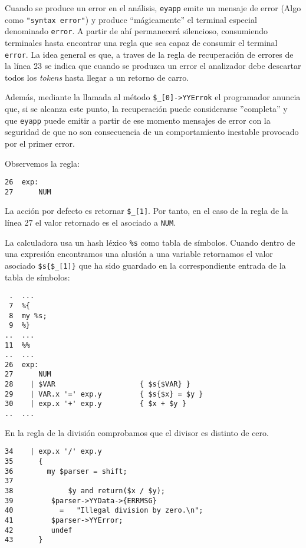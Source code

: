  Cuando se produce un error
en el análisis, \verb|eyapp| emite un mensaje de error (Algo
como \verb|"syntax error"|) y
produce ``mágicamente'' el terminal especial denominado
\verb|error|. A partir de ahí permanecerá silencioso,
consumiendo terminales hasta encontrar una
regla que sea capaz de consumir el terminal \verb|error|.
La idea general es que, a traves de la regla
de recuperación de errores de la línea 23 se
indica que cuando se produzca un error
el analizador debe descartar todos los \emph{tokens} hasta llegar a un
retorno de carro. 

Además, mediante la llamada al método  \verb|$_[0]->YYErrok| el programador
anuncia que, si se alcanza este punto, la recuperación puede considerarse ''completa''  y que 
\verb|eyapp| puede emitir a partir de ese momento mensajes de error
con la seguridad de que no son consecuencia de un comportamiento inestable
provocado por el primer error.



Observemos la regla:

\begin{verbatim}
26  exp:
27      NUM
\end{verbatim}
La acción por defecto es retornar \verb|$_[1]|. 
Por tanto, en el caso de la regla de la línea 27 
el valor retornado es el asociado a \verb|NUM|.


La calculadora usa un hash léxico \verb|%s| como tabla de símbolos.
Cuando dentro de una expresión encontramos una alusión a una variable
retornamos el valor asociado \verb|$s{$_[1]}| que ha sido guardado en la correspondiente
entrada de la tabla de símbolos:
\begin{verbatim}
 .  ...
 7  %{
 8  my %s;
 9  %}
..  ...
11  %%
..  ...
26  exp:
27      NUM
28    | $VAR                    { $s{$VAR} }
29    | VAR.x '=' exp.y         { $s{$x} = $y }
30    | exp.x '+' exp.y         { $x + $y }
..  ...
\end{verbatim}



En la regla de la división comprobamos que el divisor es 
distinto de cero. 
\begin{verbatim}
34    | exp.x '/' exp.y
35      {
36        my $parser = shift;
37
38             $y and return($x / $y);
39         $parser->YYData->{ERRMSG}
40           =   "Illegal division by zero.\n";
41         $parser->YYError;
42         undef
43      }
\end{verbatim}

